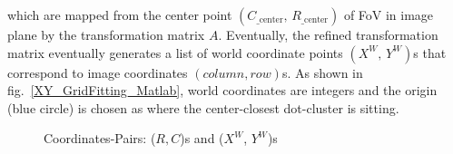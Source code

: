 \noindent
which are mapped from the center point \((C_{\text{\_center}}, \, R_{\text{\_center}})\) of FoV in image plane by the transformation matrix \(A\). Eventually, the refined transformation matrix eventually generates a list of world coordinate points \((X^W, \, Y^W)\)s that correspond to image coordinates \((column, row)\)s. As shown in fig.~\ref{XY_GridFitting_Matlab}, world coordinates are integers and the origin (blue circle) is chosen as where the center-closest dot-cluster is sitting.%
%
 \begin{figure}[t]
\hspace*{-0.3cm}
\centering
{}
{}
%
\caption{Coordinates-Pairs: (\(R, C\))s and (\(X^W\), \(Y^W\))s}
\label{Grid_Fitting}
\end{figure}%

